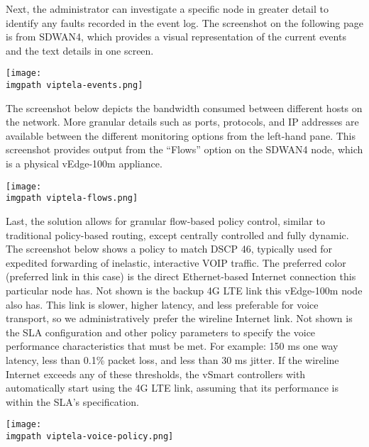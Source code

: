 Next, the administrator can investigate a specific node in greater detail to
identify any faults recorded in the event log. The screenshot on the following
page is from SDWAN4, which provides a visual representation of the current
events and the text details in one screen.

    \begin{minipage}[t]{\linewidth}
	  \centering
      \texttt{[image: \\imgpath viptela-events.png]}
    \end{minipage}

The screenshot below depicts the bandwidth consumed between different hosts on
the network. More granular details such as ports, protocols, and IP addresses
are available between the different monitoring options from the left-hand
pane. This screenshot provides output from the ``Flows'' option on the SDWAN4
node, which is a physical vEdge-100m appliance.

    \begin{minipage}[t]{\linewidth}
	  \centering
      \texttt{[image: \\imgpath viptela-flows.png]}
    \end{minipage}

Last, the solution allows for granular flow-based policy control, similar to
traditional policy-based routing, except centrally controlled and fully
dynamic. The screenshot below shows a policy to match DSCP 46, typically used
for expedited forwarding of inelastic, interactive VOIP traffic. The preferred
color (preferred link in this case) is the direct Ethernet-based Internet
connection this particular node has. Not shown is the backup 4G LTE link this
vEdge-100m node also has. This link is slower, higher latency, and less
preferable for voice transport, so we administratively prefer the wireline
Internet link. Not shown is the SLA configuration and other policy parameters
to specify the voice performance characteristics that must be met. For
example: 150 ms one way latency, less than 0.1\% packet loss, and less than 30
ms jitter. If the wireline Internet exceeds any of these thresholds, the
vSmart controllers with automatically start using the 4G LTE link, assuming
that its performance is within the SLA's specification.

    \begin{minipage}[t]{\linewidth}
	  \centering
      \texttt{[image: \\imgpath viptela-voice-policy.png]}
    \end{minipage}

